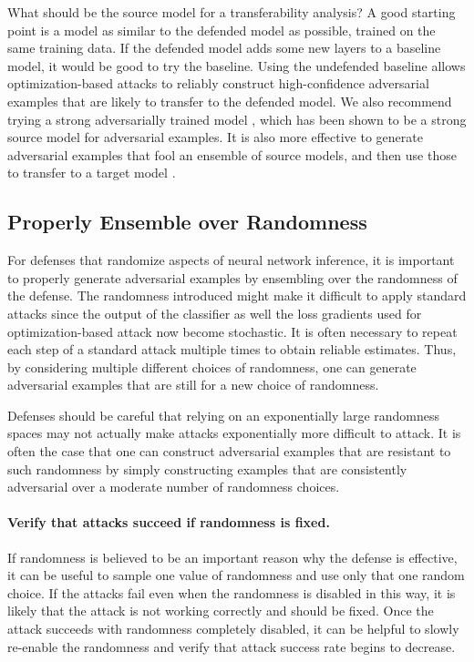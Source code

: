 \documentclass{article} %
\begin{document}
What should be the source model for a transferability analysis? A good
starting point is a model as similar to the defended model as
possible, trained on the same training data.
%
If the defended model
adds some new layers to a baseline model, it would be good to try the
baseline.
%
Using the undefended baseline allows optimization-based attacks to
reliably construct high-confidence adversarial examples that are likely to
transfer to the defended model.
%
We also recommend trying a strong adversarially
trained model \citep{madry2017towards}, which has been shown to be a strong source model for
adversarial examples.
%
It is also more effective to generate
adversarial examples that fool an ensemble of source models, and then
use those to transfer to a target model \citep{liu2016delving}.

\subsection{Properly Ensemble over Randomness}
\label{sec:eot}

For defenses that randomize aspects of neural network inference,
it is important to properly generate adversarial examples by
ensembling over the randomness of the defense.
%
The randomness introduced might make it difficult to apply standard attacks
since the output of the classifier as well the loss gradients used for
optimization-based attack now become stochastic.
%
It is often necessary to repeat each step of a standard attack multiple times
to obtain reliable estimates.
%
Thus, by considering multiple different choices of randomness, one can generate
adversarial examples that are still for a new choice of randomness.

Defenses should be careful that relying on an exponentially large
randomness spaces may not actually make attacks exponentially
more difficult to attack.
%
It is often the case that one can construct adversarial examples that are resistant
to such randomness by simply constructing examples that are consistently
adversarial over a moderate number of randomness choices.

\paragraph{Verify that attacks succeed if randomness is fixed.}
%
If randomness is believed to be an important reason why the defense
is effective, it can be useful to sample one value of randomness and
use only that one random choice.
%
If the attacks fail even when the randomness is disabled in this
way, it is likely that the attack is not working correctly and
should be fixed.
%
Once the attack succeeds with randomness
completely disabled, it can be helpful to slowly re-enable the
randomness and verify that attack success rate begins to decrease.
\end{document}
